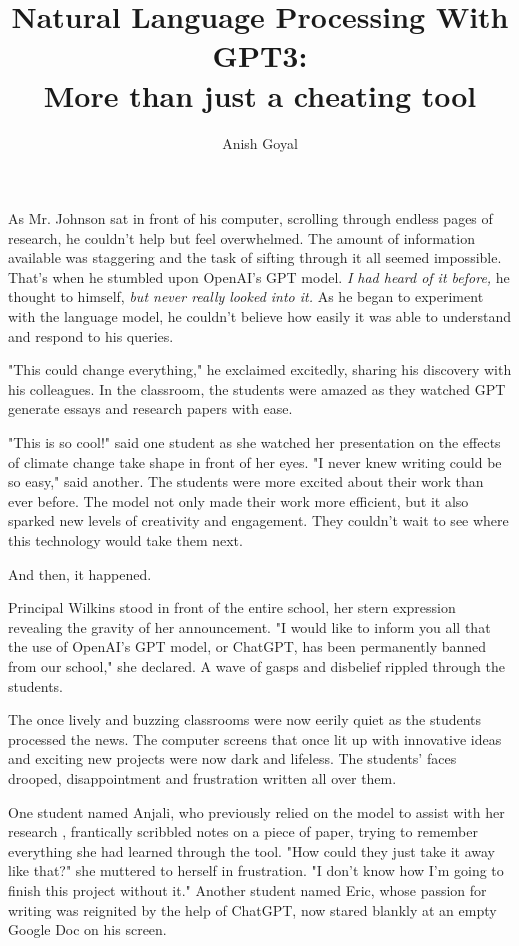 \documentclass[stu]{apa7}
\title{Natural Language Processing With GPT3:\\ More than just a cheating tool}
\author{Anish Goyal}
\begin{document}
\maketitle
As Mr. Johnson sat in front of his computer, scrolling through endless pages of research, he couldn't help but feel overwhelmed. The amount of information available was staggering and the task of sifting through it all seemed impossible. That's when he stumbled upon OpenAI's GPT model. \emph{I had heard of it before,} he thought to himself, \emph{but never really looked into it.} As he began to experiment with the language model, he couldn't believe how easily it was able to understand and respond to his queries. 

"This could change everything," he exclaimed excitedly, sharing his discovery with his colleagues. In the classroom, the students were amazed as they watched GPT generate essays and research papers with ease. 

"This is so cool!" said one student as she watched her presentation on the effects of climate change take shape in front of her eyes. "I never knew writing could be so easy," said another. The students were more excited about their work than ever before. The model not only made their work more efficient, but it also sparked new levels of creativity and engagement. They couldn't wait to see where this technology would take them next.

And then, it happened.

Principal Wilkins stood in front of the entire school, her stern expression revealing the gravity of her announcement. "I would like to inform you all that the use of OpenAI's GPT model, or ChatGPT, has been permanently banned from our school," she declared. A wave of gasps and disbelief rippled through the students.

The once lively and buzzing classrooms were now eerily quiet as the students processed the news. The computer screens that once lit up with innovative ideas and exciting new projects were now dark and lifeless. The students' faces drooped, disappointment and frustration written all over them. 

One student named Anjali, who previously relied on the model to assist with her research \autocite{idaho2022}, frantically scribbled notes on a piece of paper, trying to remember everything she had learned through the tool. "How could they just take it away like that?" she muttered to herself in frustration. "I don't know how I'm going to finish this project without it." Another student named Eric, whose passion for writing was reignited by the help of ChatGPT, now stared blankly at an empty Google Doc on his screen.
\end{document}
